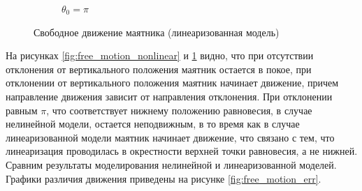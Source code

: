 \begin{figure}[ht!]
\begin{subfigure}[b]{0.45\textwidth}
        \caption{$\theta_0 = \pi$}
    \end{subfigure}
    \caption{Свободное движение маятника (линеаризованная модель)}
    \label{fig:free_motion_linear}
\end{figure}

На рисунках \ref{fig:free_motion_nonlinear} и \ref{fig:free_motion_linear} видно, что при 
отсутствии отклонения от вертикального положения маятник остается в покое, 
при отклонении от вертикального положения маятник начинает движение, причем 
направление движения зависит от направления отклонения. При отклонении 
равным $\pi$, что соответствует нижнему положению равновесия, в случае нелинейной 
модели, остается неподвижным, в то время как в случае линеаризованной модели 
маятник начинает движение, что связано с тем, что линеаризация проводилась в окрестности
верхней точки равновесия, а не нижней. Сравним результаты моделирования
нелинейной и линеаризованной моделей. Графики различия движения приведены на
рисунке \ref{fig:free_motion_err}. 

